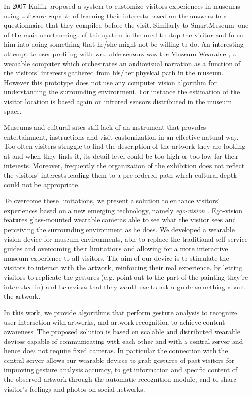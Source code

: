 In 2007 Kuflik \etal \cite{kuflik2011visitor} proposed a system to customize visitors experiences in museums using software capable of learning their interests based on the answers to a questionnaire that they compiled before the visit. Similarly to SmartMuseum, one of the main shortcomings of this system is the need to stop the visitor and force him into doing something that he/she might not be willing to do.
An interesting attempt to user profiling with wearable sensors was the Museum Wearable \cite{sparacino2002museum}, a wearable computer which orchestrates an audiovisual narration as a function of the visitors' interests gathered from his/her physical path in the museum. However this prototype does not use any computer vision algorithm for understanding the surrounding environment. For instance the estimation of the visitor location is based again on infrared sensors distributed in the museum space.

Museums and cultural sites still lack of an instrument that provides entertainment, instructions and visit customization in an effective natural way. Too often visitors struggle to find the description of the artwork they are looking at and when they finds it, its detail level could be too high or too low for their interests. Moreover, frequently the organization of the exhibition does not reflect the visitors' interests leading them to a pre-ordered path which cultural depth could not be appropriate.

To overcome these limitations, we present a solution to enhance visitors' experiences based on a new emerging technology, namely \textit{ego-vision} \cite{kanade2012}. Ego-vision features glass-mounted wearable cameras able to see what the visitor sees and perceiving the surrounding environment as he does. We developed a wearable vision device for museum environments, able to replace the traditional self-service guides and overcoming their limitations and allowing for a more interactive museum experience to all visitors. The aim of our device is to stimulate the visitors to interact with the artwork, reinforcing their real experience, by letting visitors to replicate the gestures (e.g. point out to the part of the painting they're interested in) and behaviors that they would use to ask a guide something about the artwork.

In this work, we provide algorithms that perform gesture analysis to recognize user interaction with artworks, and artwork recognition to achieve content-awareness.
The proposed solution is based on scalable and distributed wearable devices capable of communicating with each other and with a central server and hence does not require fixed cameras.
In particular the connection with the central server allows our wearable devices to grab gestures of past visitors for improving gesture analysis accuracy, to get information and specific content of the observed artwork through the automatic recognition module, and to share visitor's feelings and photos on social networks. 

